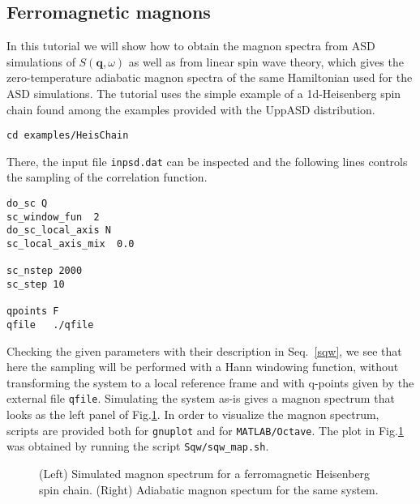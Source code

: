 \documentclass[11pt,fleqn,a4]{book} %
\begin{document}
\subsection{Ferromagnetic magnons}
In this tutorial we will show how to obtain the magnon spectra from ASD simulations of $S(\mathbf{q},\omega)$ as well as from linear spin wave theory, which gives the zero-temperature adiabatic magnon spectra of the same Hamiltonian used for the ASD simulations. The tutorial uses the simple example of a 1d-Heisenberg spin chain found among the examples provided with the UppASD distribution. 
\begin{fBox} 
\begin{Verbatim}
cd examples/HeisChain
\end{Verbatim}
\end{fBox}
There, the input file \texttt{inpsd.dat} can be inspected and the following lines controls the sampling of the correlation function.
\begin{fBox} 
\begin{Verbatim}
do_sc Q                     
sc_window_fun  2          
do_sc_local_axis N      
sc_local_axis_mix  0.0  

sc_nstep 2000     
sc_step 10        

qpoints F         
qfile   ./qfile
\end{Verbatim}
\end{fBox}
Checking the given parameters with their description in Seq.~\ref{sqw}, we see that here the sampling will be performed with a Hann windowing function, without transforming the system to a local reference frame and with q-points given by the external file \texttt{qfile}. Simulating the system as-is gives a magnon spectrum that looks as the left panel of Fig.\ref{fig:sqw_heischainfm}. In order to visualize the magnon spectrum, scripts are provided both for \texttt{gnuplot} and for \texttt{MATLAB/Octave}. The plot in Fig.\ref{fig:sqw_heischainfm} was obtained by running the script \texttt{Sqw/sqw_map.sh}.
\begin{figure}[h!]
\caption{(Left) Simulated magnon spectrum for a ferromagnetic Heisenberg spin chain.
(Right) Adiabatic magnon spectum for the same system.}
\label{fig:sqw_heischainfm}
\end{figure}
\end{document}
